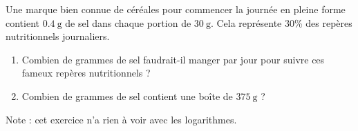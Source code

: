 
\begin{exercice}\label{exologarithme-0003}

    Une marque bien connue de céréales pour commencer la journée en pleine forme contient \( \SI{0.4}{\gram}\) de sel dans chaque portion de \( \SI{30}{\gram}\). Cela représente \( 30\)\% des repères nutritionnels journaliers.
    \begin{enumerate}
        \item
            Combien de grammes de sel faudrait-il manger par jour pour suivre ces fameux repères nutritionnels ?
        \item
            Combien de grammes de sel contient une boîte de \( \SI{375}{\gram}\) ?
    \end{enumerate}
    Note : cet exercice n'a rien à voir avec les logarithmes.

\end{exercice}
